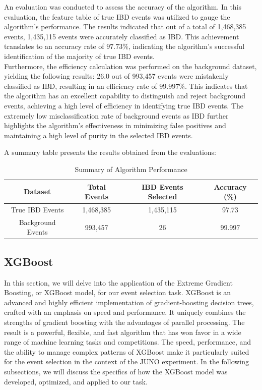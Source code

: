 An evaluation was conducted to assess the accuracy of the algorithm. In this evaluation, the feature table of true IBD events was utilized to gauge the algorithm's performance. The results indicated that out of a total of 1,468,385 events, 1,435,115 events were accurately classified as IBD. This achievement translates to an accuracy rate of $97.73\%$, indicating the algorithm's successful identification of the majority of true IBD events.\\


Furthermore, the efficiency calculation was performed on the background dataset, yielding the following results: 26.0 out of 993,457 events were mistakenly classified as IBD, resulting in an efficiency rate of $99.997\%$. This indicates that the algorithm has an excellent capability to distinguish and reject background events, achieving a high level of efficiency in identifying true IBD events. The extremely low misclassification rate of background events as IBD further highlights the algorithm's effectiveness in minimizing false positives and maintaining a high level of purity in the selected IBD events.
       

A summary table presents the results obtained from the evaluations:

\begin{table}[ht]
	\centering
	\caption{Summary of Algorithm Performance}
	\label{tab:algorithm-results}
	\begin{tabular}{|c|c|c|c|}
		\hline
		Dataset & Total Events & IBD Events Selected & Accuracy (\%) \\ \hline\hline
		True IBD Events & 1,468,385 & 1,435,115 & 97.73 \\ \hline
		Background Events & 993,457 & 26 & 99.997 \\ \hline
	\end{tabular}
\end{table}

\subsection{XGBoost}


In this section, we will delve into the application of the Extreme Gradient Boosting, or XGBoost model, for our event selection task. XGBoost is an advanced and highly efficient implementation of gradient-boosting decision trees, crafted with an emphasis on speed and performance. It uniquely combines the strengths of gradient boosting with the advantages of parallel processing. The result is a powerful, flexible, and fast algorithm that has won favor in a wide range of machine learning tasks and competitions. The speed, performance, and the ability to manage complex patterns of XGBoost make it particularly suited for the event selection in the context of the JUNO experiment. In the following subsections, we will discuss the specifics of how the XGBoost model was developed, optimized, and applied to our task.

